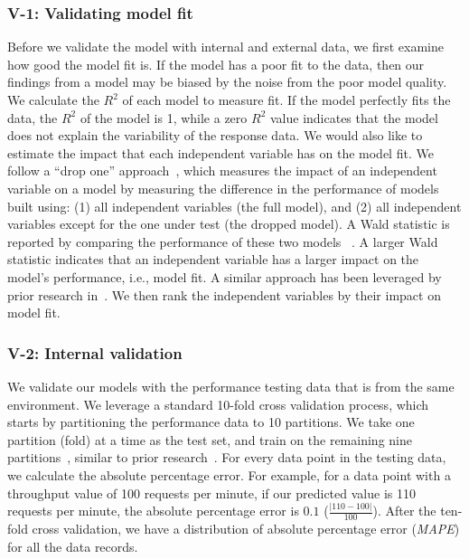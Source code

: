\documentclass[smallextended]{svjour3}       %
\begin{document}
\subsubsection{V-1: Validating model fit}

Before we validate the model with internal and external data, we first examine how good the model fit is. If the model has a poor fit to the data, then our findings from a model may be biased by the noise from the poor model quality. We calculate the $R^2$ of each model to measure fit. If the model perfectly fits the data, the $R^2$ of the model is 1, while a zero $R^2$ value indicates that the model does not explain the variability of the response data. We would also like to estimate the impact that each independent variable has on the model fit. We follow a ``drop one'' approach~\cite{Chambers1990}, which measures the impact of an independent variable on a model by measuring the difference in the performance of models built using: (1) all independent variables (the full model), and (2) all independent variables except for the one under test (the dropped model). A Wald statistic is reported by comparing the performance of these two models ~\cite{harrell2001regression}. A larger Wald statistic indicates that an independent variable has a larger impact on the model's performance, i.e., model fit. A similar approach has been leveraged by prior research in~\cite{mcintosh2015emse}. We then rank the independent variables by their impact on model fit. 


\subsubsection{V-2: Internal validation}

We validate our models with the performance testing data that is from the same environment. We leverage a standard 10-fold cross validation process, which starts by partitioning the performance data to 10 partitions. We take one partition (fold) at a time as the test set, and train on the remaining nine partitions~\cite{10foldcross,kohavi1995study}, similar to prior research~\cite{haroon}. For every data point in the testing data, we calculate the absolute percentage error. For example, for a data point with a throughput value of 100 requests per minute, if our predicted value is 110 requests per minute, the absolute percentage error is $0.1$ ($\frac{|110-100|}{100}$). After the ten-fold cross validation, we have a distribution of absolute percentage error (\textit{MAPE}) for all the data records.
\end{document}
